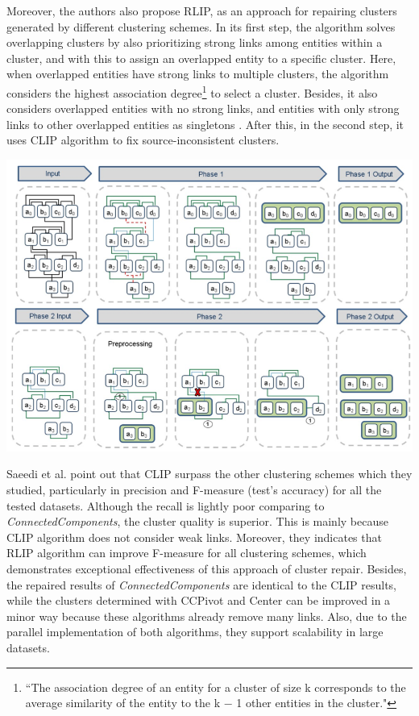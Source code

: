 \documentclass[runningheads]{llncs}
\begin{document}
Moreover, the authors also propose RLIP, as an approach for repairing clusters generated by different clustering schemes. In its first step, the algorithm solves overlapping clusters by also prioritizing strong links among entities within a cluster, and with this to assign an overlapped entity to a specific cluster. Here, when overlapped entities have strong links to multiple clusters, the algorithm considers the highest association degree\footnote{``The association degree of an entity for a cluster of size k corresponds to the average similarity of the entity to the k − 1 other entities in the cluster."\cite{Saeedi}} to select a cluster. Besides, it also considers overlapped entities with no strong links, and entities with only strong  links to other overlapped entities as singletons \cite{Saeedi}. After this, in the second step, it uses CLIP algorithm to fix source-inconsistent clusters.

\begin{center}
\includegraphics[width=1\textwidth]{clip_example.png} 
\label{fig:fig1}
\end{center}

Saeedi et al. \cite{Saeedi} point out that CLIP surpass the other clustering schemes which they studied, particularly in precision and F-measure (test's accuracy) for all the tested datasets. Although the recall is lightly poor comparing to \textit{ConnectedComponents}, the cluster quality is superior. This is mainly because CLIP algorithm does not consider weak links. Moreover, they indicates that RLIP algorithm can improve F-measure for all clustering schemes, which demonstrates exceptional effectiveness of this approach of cluster repair. Besides, the repaired results of \textit{ConnectedComponents} are identical to the CLIP results, while the clusters determined with CCPivot and Center can be improved in a minor way because these algorithms already remove many links. Also, due to the parallel implementation of both algorithms, they support scalability in large datasets.
\end{document}
